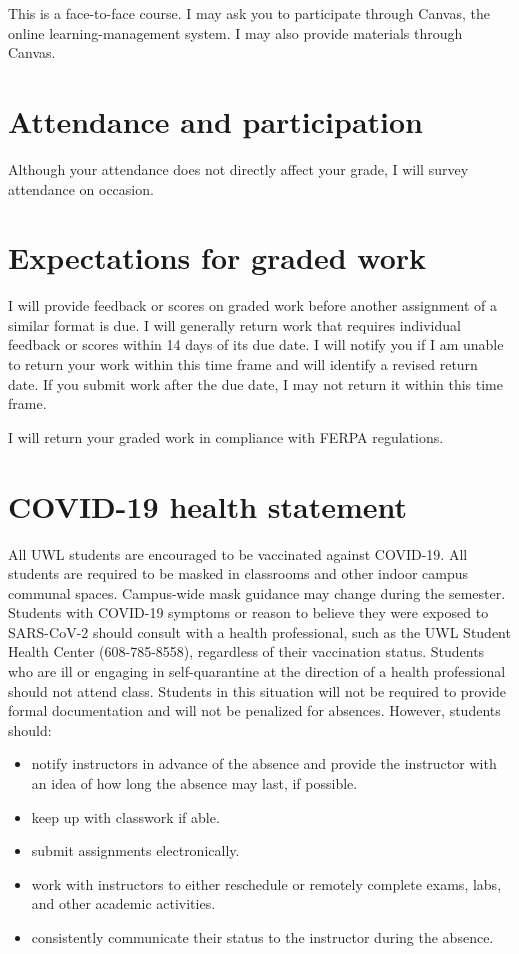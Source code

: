 \documentclass[
    letterpaper,paper=portrait,fleqn,
    DIV=16,fontsize=11pt,twoside=semi,
    parskip=full-,
    headings=standardclasses]
{scrartcl}
\begin{document}
This is a face-to-face course. I may ask you to participate through Canvas, the online learning-management system. I may also provide materials through Canvas.

\section*{Attendance and participation}

Although your attendance does not directly affect your grade, I will survey attendance on occasion.

\section*{Expectations for graded work}

I will provide feedback or scores on graded work before another assignment of a similar format is due. I will generally return work that requires individual feedback or scores within 14 days of its due date. I will notify you if I am unable to return your work within this time frame and will identify a revised return date. If you submit work after the due date, I may not return it within this time frame.

I will return your graded work in compliance with FERPA regulations.

\clearpage

\section*{COVID-19 health statement}

All UWL students are encouraged to be vaccinated against COVID-19. All students are required to be masked in classrooms and other indoor campus communal spaces. Campus-wide mask guidance may change during the semester. Students with COVID-19 symptoms or reason to believe they were exposed to SARS-CoV-2 should consult with a health professional, such as the UWL Student Health Center (608-785-8558), regardless of their vaccination status. Students who are ill or engaging in self-quarantine at the direction of a health professional should not attend class. Students in this situation will not be required to provide formal documentation and will not be penalized for absences. However, students should:

\begin{itemize}[nosep]
\item notify instructors in advance of the absence and provide the instructor with an idea of how long the absence may last, if possible. 
\item keep up with classwork if able. 
\item submit assignments electronically. 
\item work with instructors to either reschedule or remotely complete exams, labs, and other academic activities.
\item consistently communicate their status to the instructor during the absence.
\end{itemize}
\end{document}
